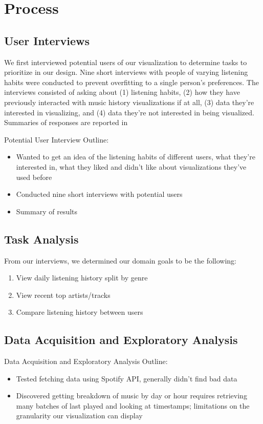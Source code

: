 \documentclass[journal]{vgtc}                %
\begin{document}
\section{Process}

\subsection{User Interviews}

We first interviewed potential users of our visualization to determine tasks to prioritize in our design. Nine short interviews with people of varying listening habits were conducted to prevent overfitting to a single person's preferences. The interviews consisted of asking about (1) listening habits, (2) how they have previously interacted with music history visualizations if at all, (3) data they're interested in visualizing, and (4) data they're not interested in being visualized. Summaries of responses are reported in %

Potential User Interview Outline:
\begin{itemize}
  \item Wanted to get an idea of the listening habits of different users, what they're interested in, what they liked and didn't like about visualizations they've used before
  \item Conducted nine short interviews with potential users
  \item Summary of results
\end{itemize}

\subsection{Task Analysis}

From our interviews, we determined our domain goals to be the following:
\begin{enumerate}
  \item View daily listening history split by genre
  \item View recent top artists/tracks
  \item Compare listening history between users
\end{enumerate}


\subsection{Data Acquisition and Exploratory Analysis}
Data Acquisition and Exploratory Analysis Outline:
\begin{itemize}
  \item Tested fetching data using Spotify API, generally didn't find bad data
  \item Discovered getting breakdown of music by day or hour requires retrieving many batches of last played and looking at timestamps; limitations on the granularity our visualization can display
\end{itemize}
\end{document}
